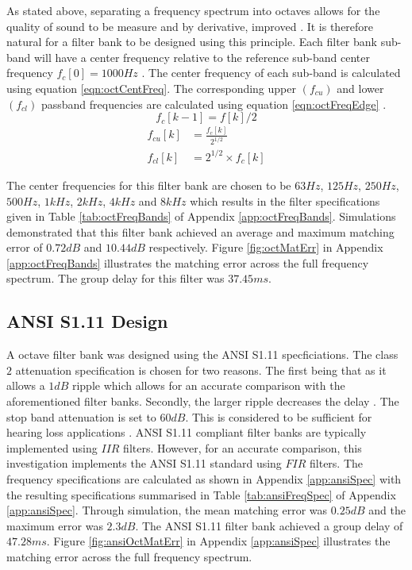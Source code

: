 \documentclass[12pt, onecolumn]{article}
\begin{document}
\noindent As stated above, separating a frequency spectrum into octaves allows for the quality of sound to be measure and by derivative, improved \cite{octave}. It is therefore natural for a filter bank to be designed using this principle. Each filter bank sub-band will have a center frequency relative to the reference sub-band center frequency $f_c [0] = 1000Hz$ \cite{octFreqCalc}. The center frequency of each sub-band is calculated using equation \ref{eqn:octCentFreq}. The corresponding upper $(f_{cu})$ and lower $(f_{cl})$ passband frequencies are calculated using equation \ref{eqn:octFreqEdge} \cite{octFreqCalc}.
%
\begin{equation}
\label{eqn:octCentFreq}
f_c[k-1] = f[k]/2 
\end{equation}
\begin{equation}
\begin{aligned}
\label{eqn:octFreqEdge}
f_{cu}[k] &= \frac{f_c[k] }{2^{1/2}}\\
f_{cl}[k] &= 2^{1/2}\times f_c[k]
\end{aligned}
\end{equation}
%

\noindent The center frequencies for this filter bank are chosen to be $63Hz$, $125Hz$, $250Hz$, $500Hz$, $1kHz$, $2kHz$, $4kHz$ and $8kHz$ which results in the filter specifications given in Table \ref{tab:octFreqBands} of Appendix \ref{app:octFreqBands}. Simulations demonstrated that this filter bank achieved an average and maximum matching error of $0.72dB$ and $10.44dB$ respectively. Figure \ref{fig:octMatErr} in Appendix \ref{app:octFreqBands} illustrates the matching error across the full frequency spectrum. The group delay for this filter was $37.45ms$.

\subsection{ANSI S1.11 Design}
\label{sec:ansi}

\noindent A octave filter bank was designed using the ANSI S1.11 specficiations. The class $2$ attenuation specification is chosen for two reasons. The first being that as it allows a $1dB$ ripple which allows for an accurate comparison with the aforementioned filter banks. Secondly, the larger ripple decreases the delay \cite{yang}. The stop band attenuation is set to $60dB$. This is considered to be sufficient for hearing loss applications \cite{ansiAtten}. ANSI S1.11 compliant filter banks are typically implemented using $IIR$ filters. However, for an accurate comparison, this investigation implements the ANSI S1.11 standard using $FIR$ filters. The frequency specifications are calculated as shown in Appendix \ref{app:ansiSpec} with the resulting specifications summarised in Table \ref{tab:ansiFreqSpec} of Appendix \ref{app:ansiSpec}. Through simulation, the mean matching error was $0.25dB$ and the maximum error was $2.3dB$. The ANSI S1.11 filter bank achieved a group delay of $47.28ms$. Figure \ref{fig:ansiOctMatErr} in Appendix \ref{app:ansiSpec} illustrates the matching error across the full frequency spectrum.
\end{document}
